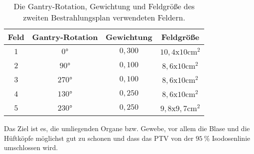 \begin{table}
	\centering
	\caption{Die Gantry-Rotation, Gewichtung und Feldgröße des zweiten Bestrahlungsplan verwendeten Feldern.}
	\label{tab:Felder2}
	\begin{tabular}{c c c c}
		\toprule
		Feld & Gantry-Rotation & Gewichtung & Feldgröße\\
		\midrule
		$1$ & $0°$ & $0,300$ & $10,4$x$10 \si{\centi\meter\squared}$ \\
		$2$ & $90°$ & $0,100$ & $8,6$x$10 \si{\centi\meter\squared}$ \\
		$3$ & $270°$ & $0,100$ & $8,6$x$10 \si{\centi\meter\squared}$ \\
		$4$ & $130°$ & $0,250$ & $8,6$x$10 \si{\centi\meter\squared}$ \\
		$5$ & $230°$ & $0,250$ & $9,8$x$9,7 \si{\centi\meter\squared}$ \\
		\bottomrule
	\end{tabular}
\end{table}

Das Ziel ist es, die umliegenden Organe bzw. Gewebe, vor allem die Blase und die Hüftköpfe möglichst gut zu schonen und dass das PTV von der $\SI{95}{\percent}$ Isodosenlinie umschlossen wird.